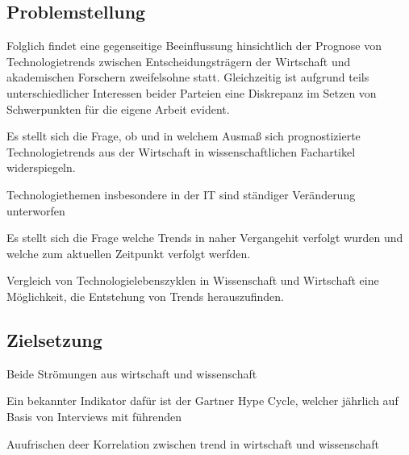 \subsection{Problemstellung}
Folglich findet eine gegenseitige Beeinflussung hinsichtlich der Prognose von Technologietrends zwischen Entscheidungsträgern der Wirtschaft und akademischen Forschern zweifelsohne statt. Gleichzeitig ist aufgrund teils unterschiedlicher Interessen beider Parteien eine Diskrepanz im Setzen von Schwerpunkten für die eigene Arbeit evident.

Es stellt sich die Frage, ob und in welchem Ausmaß sich prognostizierte Technologietrends aus der Wirtschaft in wissenschaftlichen Fachartikel widerspiegeln.


Technologiethemen insbesondere in der IT sind ständiger Veränderung unterworfen

Es stellt sich die Frage welche Trends in naher Vergangehit verfolgt wurden und welche zum aktuellen Zeitpunkt verfolgt werfden.

Vergleich von Technologielebenszyklen in Wissenschaft und Wirtschaft eine Möglichkeit, die Entstehung von Trends herauszufinden.

\subsection{Zielsetzung}
Beide Strömungen aus wirtschaft und wissenschaft

Ein bekannter Indikator dafür ist der Gartner Hype Cycle, welcher jährlich auf Basis von Interviews mit führenden 

Auufrischen deer Korrelation zwischen trend in wirtschaft und wissenschaft